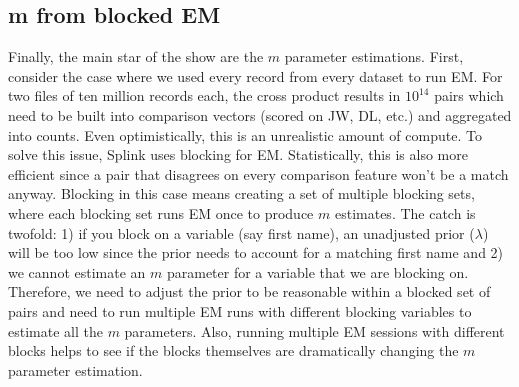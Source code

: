\documentclass[11pt]{article}
\begin{document}
\subsection{m from blocked EM}

Finally, the main star of the show are the $m$ parameter estimations. First, consider the case where we used every record from every dataset to run EM. For two files of ten million records each, the cross product results in $10^{14}$ pairs which need to be built into comparison vectors (scored on JW, DL, etc.) and aggregated into counts. Even optimistically, this is an unrealistic amount of compute. To solve this issue, Splink uses blocking for EM. Statistically, this is also more efficient since a pair that disagrees on every comparison feature won't be a match anyway. Blocking in this case means creating a set of multiple blocking sets, where each blocking set runs EM once to produce $m$ estimates. The catch is twofold: 1) if you block on a variable (say first name), an unadjusted prior ($\lambda$) will be too low since the prior needs to account for a matching first name and 2) we cannot estimate an $m$ parameter for a variable that we are blocking on. Therefore, we need to adjust the prior to be reasonable within a blocked set of pairs and need to run multiple EM runs with different blocking variables to estimate all the $m$ parameters. Also, running multiple EM sessions with different blocks helps to see if the blocks themselves are dramatically changing the $m$ parameter estimation.
\end{document}
